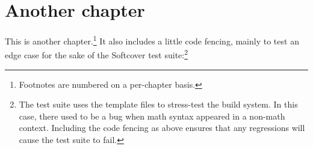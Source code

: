\chapter{Another chapter}

This is another chapter.\footnote{Footnotes are numbered on a per-chapter basis.} It also includes a little code fencing, mainly to test an edge case for the sake of the Softcover test suite:\footnote{The test suite uses the template files to stress-test the build system. In this case, there used to be a bug when math syntax appeared in a non-math context. Including the code fencing as above ensures that any regressions will cause the test suite to fail.}

